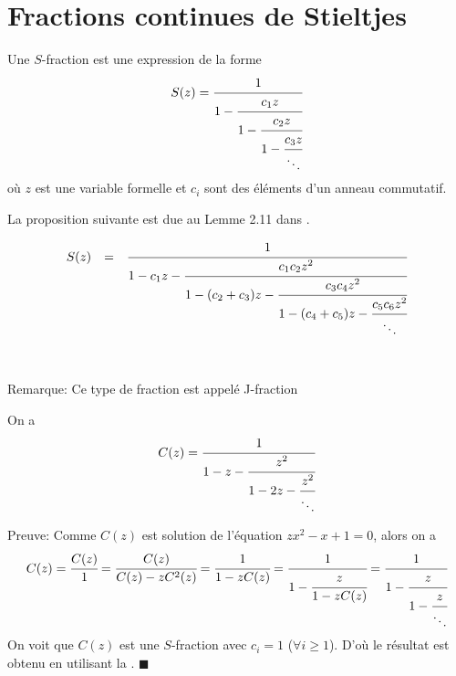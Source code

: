 \section{Fractions continues de Stieltjes}
\begin{definition}
	\begin{rm}
		Une $S$-fraction est une expression de la forme
		\[
			S(z)=\cfrac{1}{1-\cfrac{c_{1}z}{1-\cfrac{c_{2}z}{1-\cfrac{c_{3}z}{\ddots}}}}
		\]
		où $z$ est une variable formelle et $c_{i}$ sont des éléments d'un anneau commutatif.
	\end{rm}
\end{definition}
La proposition suivante est due au Lemme 2.11 dans \cite{ref30}.
\begin{proposition}\label{j-frac}
	\begin{rm}
		\[
			\begin{array}{l l l}

				S(z) & =       & \cfrac{1}{1-c_{1}z-\cfrac{c_{1}c_{2}z^2}{1-(c_{2}+c_{3})z-\cfrac{c_{3}c_{4}z^2}{1-(c_{4}+c_{5})z-\cfrac{c_{5}c_{6}z^2}{\ddots}}}}                \\
				     & \text{} &                                                                                                                                                  \\

				     & \text{} &
			\end{array}
		\]
		
		Remarque: Ce type de fraction est appelé J-fraction
	\end{rm}
\end{proposition}

\begin{proposition}\label{cat-frac}
	On a
	\[C(z) = \cfrac{1}{1-z-\cfrac{z^2}{1-2z-\cfrac{z^2}{\ddots}}} \]
\end{proposition}
Preuve:
Comme $C(z)$ est solution de l'équation $zx^{2} - x +1 =0$, alors on a
\[
	C(z) = \cfrac{C(z)}{1}=\cfrac{C(z)}{C(z)-zC^2(z)}=\cfrac{1}{1-zC(z)}= \cfrac{1}{1-\cfrac{z}{1-zC(z)}} = \cfrac{1}{1-\cfrac{z}{1-\cfrac{z}{\ddots}}}
\]
On voit que $C(z)$ est une $S$-fraction avec $c_{i}=1$ ($\forall i \geq 1$).
D'où le résultat est obtenu en utilisant la . \hspace{10pt} $\blacksquare$

